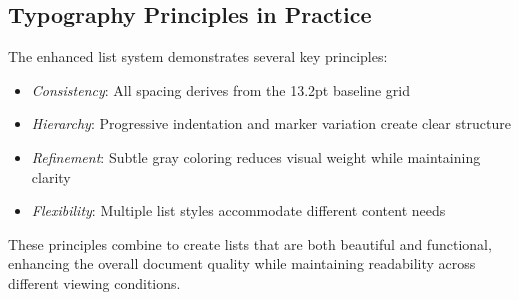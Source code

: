 \documentclass[11pt,letterpaper]{article}
\begin{document}
\subsection{Typography Principles in Practice}

The enhanced list system demonstrates several key principles:

\begin{itemize}
\item \emph{Consistency}: All spacing derives from the 13.2pt baseline grid
\item \emph{Hierarchy}: Progressive indentation and marker variation create clear structure  
\item \emph{Refinement}: Subtle gray coloring reduces visual weight while maintaining clarity
\item \emph{Flexibility}: Multiple list styles accommodate different content needs
\end{itemize}

These principles combine to create lists that are both beautiful and functional, enhancing the overall document quality while maintaining readability across different viewing conditions.
\end{document}
